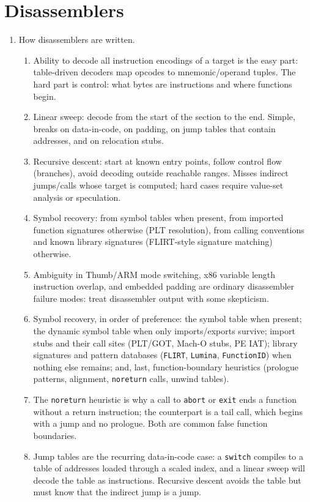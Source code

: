 \documentclass[12pt]{Training}
\begin{document}
\section*{Disassemblers}
\begin{enumerate}
    \item How disassemblers are written.
    \begin{enumerate}
        \item Ability to decode all instruction encodings of a target is the easy part: table-driven decoders map opcodes to mnemonic/operand tuples. The hard part is control: what bytes are instructions and where functions begin.
        \item Linear sweep: decode from the start of the section to the end. Simple, breaks on data-in-code, on padding, on jump tables that contain addresses, and on relocation stubs.
        \item Recursive descent: start at known entry points, follow control flow (branches), avoid decoding outside reachable ranges. Misses indirect jumps/calls whose target is computed; hard cases require value-set analysis or speculation.
        \item Symbol recovery: from symbol tables when present, from imported function signatures otherwise (PLT resolution), from calling conventions and known library signatures (FLIRT-style signature matching) otherwise.
        \item Ambiguity in Thumb/ARM mode switching, x86 variable length instruction overlap, and embedded padding are ordinary disassembler failure modes: treat disassembler output with some skepticism.
        \item Symbol recovery, in order of preference: the symbol table when present; the dynamic symbol table when only imports/exports survive; import stubs and their call sites (PLT/GOT, Mach-O stubs, PE IAT); library signatures and pattern databases (\lstinline{FLIRT}, \lstinline{Lumina}, \lstinline{FunctionID}) when nothing else remains; and, last, function-boundary heuristics (prologue patterns, alignment, \lstinline{noreturn} calls, unwind tables).
        \item The \lstinline{noreturn} heuristic is why a call to \lstinline{abort} or \lstinline{exit} ends a function without a return instruction; the counterpart is a tail call, which begins with a jump and no prologue. Both are common false function boundaries.
        \item Jump tables are the recurring data-in-code case: a \lstinline{switch} compiles to a table of addresses loaded through a scaled index, and a linear sweep will decode the table as instructions. Recursive descent avoids the table but must know that the indirect jump is a jump.

\end{enumerate}
\end{enumerate}
\end{document}
